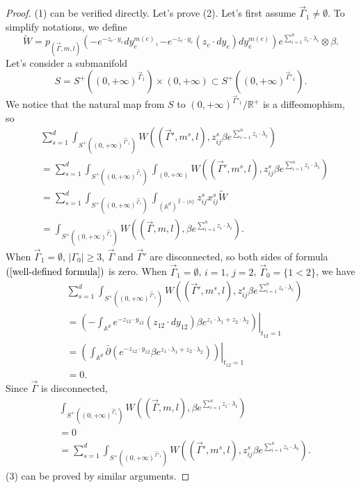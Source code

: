 \documentclass[11pt]{amsart}
\theoremstyle{definition}
\theoremstyle{remark}
\numberwithin{equation}{section}
\begin{document}
\begin{proof}
    (1) can be verified directly. Let's prove (2). Let's first assume $\vec{\Gamma}_{1}\neq\emptyset$. To simplify notations, we define
    $$
    \tilde{W}=p_{(\vec{\Gamma},m,l)}(-e^{-z_{e}\cdot y_{e}}dy_{e}^{m(e)},-e^{-z_{e}\cdot y_{e}}(z_{e}\cdot dy_{e})dy_{e}^{m(e)})e^{\sum_{i=1}^{n}z_{i}\cdot\lambda_{i}}\otimes \beta.
    $$
    Let's consider a submanifold
    $$
    S=S^{+}((0,+\infty)^{\vec{\Gamma}_{1}})\times(0,+\infty)\subset S^{+}((0,+\infty)^{\vec{\Gamma}'_{1}}).
    $$
    We notice that the natural map from $S$ to $(0,+\infty)^{\vec{\Gamma}'_{1}}/\mathbb{R}^{+}$ is a diffeomophism, so
    \begin{align*}
        &\sum_{s=1}^{d}\int_{S^{+}((0,+\infty)^{\vec{\Gamma}'_{1}})}W((\vec{\Gamma}',m^{s},l),z_{ij}^{s}\beta e^{\sum_{i=1}^{n}z_{i}\cdot\lambda_{i}})\\
        &=
        \sum_{s=1}^{d}\int_{S^{+}((0,+\infty)^{\vec{\Gamma}_{1}})}\int_{(0,+\infty)}W((\vec{\Gamma}',m^{s},l),z_{ij}^{s}\beta e^{\sum_{i=1}^{n}z_{i}\cdot\lambda_{i}})\\
        &=\sum_{s=1}^{d}\int_{S^{+}((0,+\infty)^{\vec{\Gamma}_{1}})}\int_{(\mathbb{A}^{d})^{\vec{I}-\{n\}}}z_{ij}^{s}x_{ij}^{s}\tilde{W}\\
        &=
        \int_{S^{+}((0,+\infty)^{\vec{\Gamma}_{1}})}W((\vec{\Gamma},m,l),\beta e^{\sum_{i=1}^{n}z_{i}\cdot\lambda_{i}}).
    \end{align*}
    When $\vec{\Gamma}_{1}=\emptyset$, $|\Gamma_{0}|\geq3$, $\vec{\Gamma}$ and $\vec{\Gamma}'$ are disconnected, so both sides of formula $(\ref{well-defined formula})$ is zero. When $\vec{\Gamma}_{1}=\emptyset$, $i=1$, $j=2$, $\vec{\Gamma}_{0}=\{1<2\}$, we have
    \begin{align*}
        &\sum_{s=1}^{d}\int_{S^{+}((0,+\infty)^{\vec{\Gamma}'_{1}})}W((\vec{\Gamma}',m^{s},l),z_{ij}^{s}\beta e^{\sum_{i=1}^{n}z_{i}\cdot\lambda_{i}})\\
        &=
        \left.\left(
        -\int_{\mathbb{A}^{d}}e^{-z_{12}\cdot y_{12}}(z_{12}\cdot dy_{12})\beta e^{z_{1}\cdot \lambda_{1}+z_{2}\cdot \lambda_{2}}
        \right)\right|_{t_{12}=1}\\
        &=
        \left.\left(
        \int_{\mathbb{A}^{d}}\bar{\partial}\left(e^{-z_{12}\cdot y_{12}}\beta e^{z_{1}\cdot \lambda_{1}+z_{2}\cdot \lambda_{2}}
        \right)\right)\right|_{t_{12}=1}\\
        &=0.
    \end{align*}
    Since $\vec{\Gamma}$ is disconnected, 
    \begin{align*}
        &\int_{S^{+}((0,+\infty)^{\vec{\Gamma}_{1}})}W((\vec{\Gamma},m,l),\beta e^{\sum_{i=1}^{n}z_{i}\cdot\lambda_{i}})\\
        &=0\\
        &=
        \sum_{s=1}^{d}\int_{S^{+}((0,+\infty)^{\vec{\Gamma}'_{1}})}W((\vec{\Gamma}',m^{s},l),z_{ij}^{s}\beta e^{\sum_{i=1}^{n}z_{i}\cdot\lambda_{i}}).
    \end{align*}
    (3) can be proved by similar arguments.
\end{proof}
\end{document}
